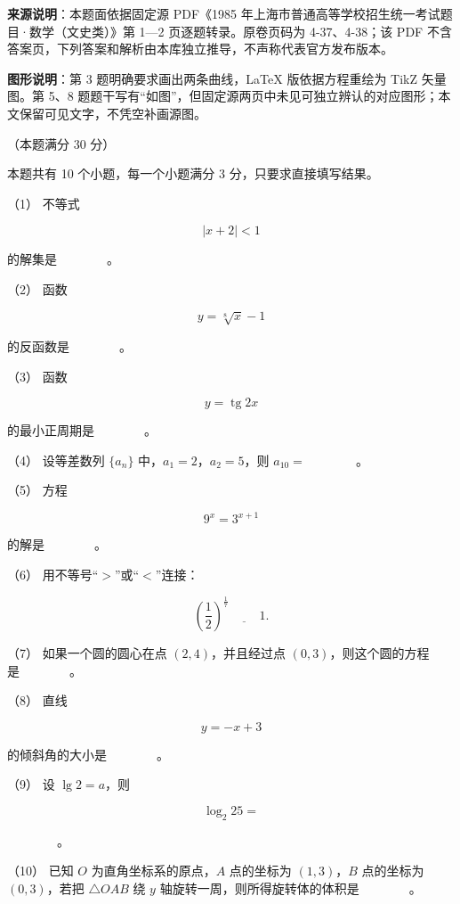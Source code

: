 

\begin{gktip}
\textbf{来源说明}：本题面依据固定源 PDF《1985 年上海市普通高等学校招生统一考试题目·数学（文史类）》第 1—2 页逐题转录。原卷页码为 4-37、4-38；该 PDF 不含答案页，下列答案和解析由本库独立推导，不声称代表官方发布版本。

\textbf{图形说明}：第 3 题明确要求画出两条曲线，LaTeX 版依据方程重绘为 TikZ 矢量图。第 5、8 题题干写有“如图”，但固定源两页中未见可独立辨认的对应图形；本文保留可见文字，不凭空补画源图。
\end{gktip}

\begin{question}
（本题满分 30 分）

本题共有 10 个小题，每一个小题满分 3 分，只要求直接填写结果。

（1） 不等式

\nopagebreak[4]
\[
|x+2|<1
\]

的解集是　　　　。

（2） 函数

\nopagebreak[4]
\[
y=\sqrt[8]{x}-1
\]

的反函数是　　　　。

（3） 函数

\nopagebreak[4]
\[
y=\operatorname{tg}2x
\]

的最小正周期是　　　　。

（4） 设等差数列 $\{a_n\}$ 中，$a_1=2$，$a_2=5$，则
$a_{10}=$　　　　。

（5） 方程

\nopagebreak[4]
\[
9^x=3^{x+1}
\]

的解是　　　　。

（6） 用不等号“$>$”或“$<$”连接：

\nopagebreak[4]
\[
\left(\frac12\right)^{\frac17}\ \underline{\hspace{2em}}\ 1.
\]

（7） 如果一个圆的圆心在点 $(2,4)$，并且经过点 $(0,3)$，则这个圆的方程是　　　　。

（8） 直线

\nopagebreak[4]
\[
y=-x+3
\]

的倾斜角的大小是　　　　。

（9） 设 $\lg2=a$，则

\nopagebreak[4]
\[
\log_2 25=
\]

　　　　。

（10） 已知 $O$ 为直角坐标系的原点，$A$ 点的坐标为 $(1,3)$，$B$ 点的坐标为 $(0,3)$，若把 $\triangle OAB$ 绕 $y$ 轴旋转一周，则所得旋转体的体积是　　　　。

\end{question}
